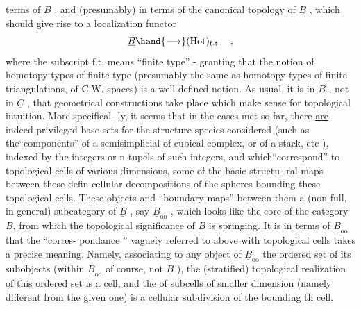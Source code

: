 
terms of $\underline{B}$ , and (presumably) in terms of the canonical topology of $\underline{B}$ ,
which should give rise to a localization functor
\[ \underline{B} \hand{\longrightarrow} (\mathrm{Hot})_{\mathrm{f.t.}} \quad , \]
where the subscript f.t. means ``finite type'' - granting that the notion
of homotopy types of finite type (presumably the same as homotopy types
of finite triangulations, of  C.W. spaces) is a well defined notion.
As usual, it is in $\underline{B}$ , not in $\underline{C}$ , that geometrical constructions
take place which make sense for topological intuition. More specifical-%
ly, it seems that in the cases met  so far, there \uline{are} indeed privileged
base-sets for the structure species considered (such as the``components''
of a semisimplicial of cubical complex, or of a stack, etc ), indexed
by the  integers or n-tupels of such integers, and which``correspond'' to
topological cells of various dimensions,  some of the basic structu-%
ral  maps between these  defin cellular decompositions of the  spheres
bounding these topological cells. These objects and ``boundary\hand{*} maps''
between them  a (non full, in general) subcategory of $\underline{B}$ , say $\underline{B}_{\mathrm{oo}}$ ,
which looks like the core of the category $\underline{B}$, from which the topological
significance of $\underline{B}$ is springing. It is in terms of $\underline{B}_{\mathrm{oo}}$ that the ``corres-%
pondance '' \hand{(}vaguely referred to above\hand{)} with topological cells  takes a
precise meaning. Namely, associating to any object of $\underline{B}_{\mathrm{oo}}$ the ordered
set of its subobjects (within $\underline{B}_{\mathrm{oo}}$ of course, not $\underline{B}$ ), the 
(stratified) topological realization of this ordered set is a cell, and
the  of  subcells of smaller dimension (namely different from
the given one) is a cellular subdivision of the  bounding th cell.

